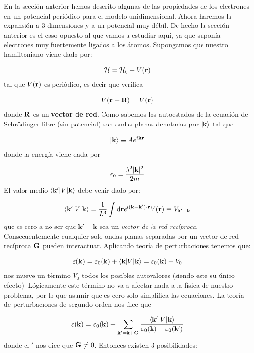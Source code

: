 En la sección anterior hemos descrito algunas de las propiedades de los electrones en un potencial periódico para el modelo unidimensional. Ahora haremos la expansión a 3 dimensiones y a un potencial muy débil. De hecho la sección anterior es el caso opuesto al que vamos a estudiar aquí, ya que suponía electrones muy fuertemente ligados a los átomos. Supongamos que nuestro hamiltoniano viene dado por:

\begin{equation}
	\mathcal{H} = \mathcal{H}_0 + V(\mathbf{r})
\end{equation}
tal que $V(\mathbf{r})$ es periódico, es decir que verifica 

\begin{equation}
	V(\mathbf{r}+\mathbf{R})=V(\mathbf{r})
\end{equation}
donde $\mathbf{R}$ es un \textbf{vector de red}. Como sabemos los autoestados de la ecuación de Schrödinger libre (sin potencial) son ondas planas denotadas por $|\mathbf{k}\rangle$ tal que

\begin{equation}
	|\mathbf{k}\rangle \equiv A e^{i\mathbf{k} \mathbf{r}}
\end{equation}
donde la energía viene dada por

\begin{equation}
	\varepsilon_0 = \frac{\hbar^2 |\mathbf{k}|^2}{2m}
\end{equation}
El valor medio $\langle \mathbf{k}'|V|\mathbf{k} \rangle$ debe venir dado por:


\begin{equation}
	\langle \mathbf{k}'|V|\mathbf{k} \rangle  = \frac{1}{L^3} \int \mathrm{d} \mathbf{r} e^{i(\mathbf{k}-\mathbf{k}')\cdot \mathbf{r}} V(\mathbf{r}) \equiv V_{\mathbf{k}'-\mathbf{k}}
\end{equation}
que es cero a no ser que $\mathbf{k}'-\mathbf{k}$ sea un \textit{vector de la red recíproca}. Consecuentemente cualquier solo ondas planas separadas por un vector de red recíproca $\mathbf{G}$ pueden interactuar. Aplicando teoría de perturbaciones tenemos que:

\begin{equation}
	\varepsilon(\mathbf{k})  =\varepsilon_0 (\mathbf{k}) + \langle \mathbf{k} |V|\mathbf{k} \rangle = \varepsilon_0 (\mathbf{k}) + V_0
\end{equation}
nos mueve un término $V_0$ todos los posibles autovalores (siendo este su único efecto). Lógicamente este término no va a afectar nada a la física de nuestro problema, por lo que asumir que es cero solo simplifica las ecuaciones. La teoría de perturbaciones de segundo orden nos dice que


\begin{equation}
	\varepsilon(\mathbf{k})  =\varepsilon_0 (\mathbf{k}) + \sum_{\mathbf{k}'=\mathbf{k}+\mathbf{G}} \frac{\langle \mathbf{k}' |V|\mathbf{k} \rangle}{  \varepsilon_0 (\mathbf{k}) - \varepsilon_0 (\mathbf{k}')}
\end{equation}
donde el $'$ nos dice que $\mathbf{G} \neq 0$. Entonces existen 3 posibilidades:

